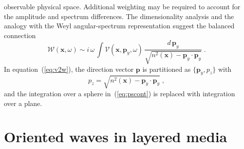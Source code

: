 observable physical space.  Additional weighting may be required to account
for the amplitude and spectrum differences. The dimensionality analysis and
the analogy with the Weyl angular-spectrum representation \cite[]{santo} suggest
the balanced connection
\begin{equation}
  \label{eq:v2w}
  \mathcal{W}(\mathbf{x},\omega) \sim i\,\omega\,\int 
  \mathcal{V}(\mathbf{x},\mathbf{p}_y,\omega)\,
  \frac{d\,\mathbf{p}_y}
  {\sqrt{n^2(\mathbf{x})-\mathbf{p}_y \cdot \mathbf{p}_y}}\;.
\end{equation}
In equation~(\ref{eq:v2w}), the direction vector $\mathbf{p}$ is 
partitioned as $\{\mathbf{p}_y,p_z\}$ with
\[
p_z=\sqrt{n^2(\mathbf{x})-\mathbf{p}_y \cdot \mathbf{p}_y}\;,
\]
and the integration over a sphere in~(\ref{eq:pscont}) is replaced with
integration over a plane.

\section{Oriented waves in layered media}


